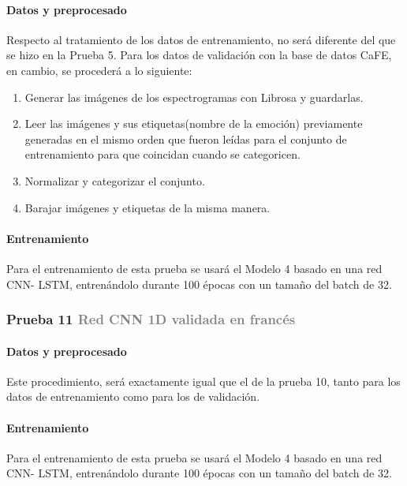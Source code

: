 \documentclass[11pt,a4paper,spanish]{book}
\begin{document}
\hfill\begin{minipage}{\dimexpr\textwidth-1cm}
	
	\paragraph{Datos y preprocesado} Respecto al tratamiento de los datos de entrenamiento, no será diferente del que se hizo en la Prueba 5.
	Para los datos de validación con la base de datos CaFE, en cambio, se procederá a lo siguiente:
	\begin{enumerate}
		\item Generar las imágenes de los espectrogramas con Librosa y guardarlas.
		\item Leer las imágenes y sus etiquetas(nombre de la emoción) previamente generadas en el mismo orden que fueron leídas para el conjunto de entrenamiento para que coincidan cuando se categoricen.
		\item Normalizar y categorizar el conjunto.
		\item Barajar imágenes y etiquetas de la misma manera.
	\end{enumerate}
	
	\paragraph{Entrenamiento}   Para el entrenamiento de esta prueba se usará el Modelo 4 basado en una red CNN- LSTM, entrenándolo durante 100 épocas con un tamaño del batch de 32.
	
\end{minipage}

	\subsubsection{\large Prueba 11 {\normalsize \textcolor{Gray}{Red CNN 1D validada en francés}}}
	
	\hfill\begin{minipage}{\dimexpr\textwidth-1cm}
		
		\paragraph{Datos y preprocesado} Este procedimiento, será exactamente igual que el de la prueba 10, tanto para los datos de entrenamiento como para los de validación.\\
		
		\paragraph{Entrenamiento} Para el entrenamiento de esta prueba se usará el Modelo 4 basado en una red CNN- LSTM, entrenándolo durante 100 épocas con un tamaño del batch de 32.\\
		
	\end{minipage}
\end{document}
